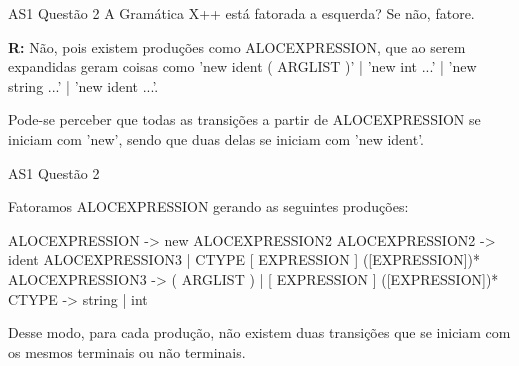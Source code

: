 \documentclass[10pt]{beamer}
\begin{document}
\begin{frame}{AS1 Questão 2}
    A Gramática X++ está fatorada a esquerda? Se não, fatore.

    \textbf{R:} Não, pois existem produções como ALOCEXPRESSION, que ao serem
    expandidas geram coisas como 'new ident ( ARGLIST )' | 'new int ...' |
    'new string ...' | 'new ident ...'.

    Pode-se perceber que todas as transições a partir de ALOCEXPRESSION se
    iniciam com 'new', sendo que duas delas se iniciam com 'new ident'.
\end{frame}

\begin{frame}{AS1 Questão 2}

    Fatoramos ALOCEXPRESSION gerando as seguintes produções:

    ALOCEXPRESSION -> new ALOCEXPRESSION2
    ALOCEXPRESSION2 -> ident ALOCEXPRESSION3 | CTYPE [ EXPRESSION ] ([EXPRESSION])*
    ALOCEXPRESSION3 -> ( ARGLIST ) | [ EXPRESSION ] ([EXPRESSION])*
    CTYPE -> string | int

    Desse modo, para cada produção, não existem duas transições que se iniciam
    com os mesmos terminais ou não terminais.

\end{frame}
\end{document}
